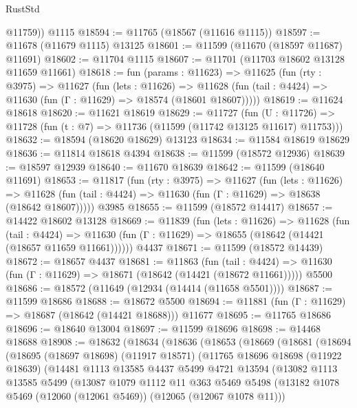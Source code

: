 \begin{lexlean}{RustStd}
\begin{coremodule}
        @11759))
    @1115
@18594 := @11765 (@18567 (@11616 @1115))
@18597 := @11678 (@11679 @1115) @13125
@18601 := @11599 (@11670 (@18597 @11687) @11691)
@18602 := @11704 @1115
@18607 := @11701 (@11703 @18602 @13128 @11659 @11661)
@18618 := fun (params : @11623) =>
  @11625
    (fun (rty : @3975) =>
    @11627
      (fun (lets : @11626) =>
      @11628 (fun (tail : @4424) => @11630 (fun (Γ : @11629) => @18574 (@18601 @18607)))))
@18619 := @11624 @18618
@18620 := @11621 @18619
@18629 := @11727
    (fun (U : @11726) => @11728 (fun (t : @7) => @11736 (@11599 (@11742 @13125 @11617) @11753)))
@18632 := @18594 (@18620 @18629) @13123
@18634 := @11584 @18619 @18629
@18636 := @11814 @18618 @4394
@18638 := @11599 (@18572 @12936)
@18639 := @18597 @12939
@18640 := @11670 @18639
@18642 := @11599 (@18640 @11691)
@18653 := @11817
    (fun (rty : @3975) =>
    @11627
      (fun (lets : @11626) =>
      @11628 (fun (tail : @4424) => @11630 (fun (Γ : @11629) => @18638 (@18642 @18607)))))
    @3985
@18655 := @11599 (@18572 @14417)
@18657 := @14422 @18602 @13128
@18669 := @11839
    (fun (lets : @11626) =>
    @11628
      (fun (tail : @4424) =>
      @11630 (fun (Γ : @11629) => @18655 (@18642 (@14421 (@18657 @11659 @11661))))))
    @4437
@18671 := @11599 (@18572 @14439)
@18672 := @18657 @4437
@18681 := @11863
    (fun (tail : @4424) => @11630 (fun (Γ : @11629) => @18671 (@18642 (@14421 (@18672 @11661)))))
    @5500
@18686 := @18572 (@11649 (@12934 (@14414 (@11658 @5501))))
@18687 := @11599 @18686
@18688 := @18672 @5500
@18694 := @11881 (fun (Γ : @11629) => @18687 (@18642 (@14421 @18688))) @11677
@18695 := @11765 @18686
@18696 := @18640 @13004
@18697 := @11599 @18696
@18698 := @14468 @18688
@18908 := @18632
    (@18634
      (@18636
        (@18653
          (@18669
            (@18681
              (@18694
                (@18695
                  (@18697 @18698)
                  (@11917 @18571)
                  (@11765
                    @18696
                    @18698
                    (@11922 @18639)
                    (@14481
                      @1113
                      @13585
                      @4437
                      @5499
                      @4721
                      @13594
                      (@13082
                        @1113
                        @13585
                        @5499
                        (@13087
                          @1079
                          @1112
                          @11
                          @363
                          @5469
                          @5498
                          (@13182 @1078 @5469 (@12060 (@12061 @5469)) (@12065 (@12067 @1078 @11)))

\end{coremodule}
\end{lexlean}
